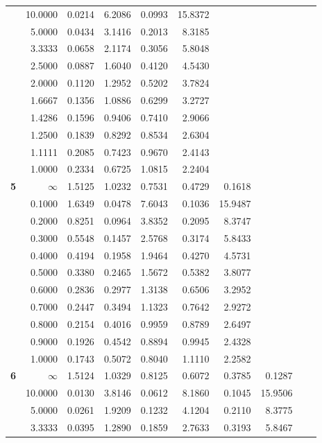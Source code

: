 \begin{table}[!htb]
\begin{center}
{\begin{tabular}{|c||r|r|r|r|r|r|r|r|r|}
&10.0000&0.0214&6.2086&0.0993&15.8372&     &     &     &     \\
&5.0000&0.0434&3.1416&0.2013&8.3185&     &     &     &     \\
&3.3333&0.0658&2.1174&0.3056&5.8048&     &     &     &     \\
&2.5000&0.0887&1.6040&0.4120&4.5430&     &     &     &     \\
&2.0000&0.1120&1.2952&0.5202&3.7824&     &     &     &     \\
&1.6667&0.1356&1.0886&0.6299&3.2727&     &     &     &     \\
&1.4286&0.1596&0.9406&0.7410&2.9066&     &     &     &     \\
&1.2500&0.1839&0.8292&0.8534&2.6304&     &     &     &     \\
&1.1111&0.2085&0.7423&0.9670&2.4143&     &     &     &     \\
&1.0000&0.2334&0.6725&1.0815&2.2404&     &     &     &     \\ \hline
\textbf{ 5}&$\infty$&1.5125&1.0232&0.7531&0.4729&0.1618&     &     &     \\
&0.1000&1.6349&0.0478&7.6043&0.1036&15.9487&     &     &     \\
&0.2000&0.8251&0.0964&3.8352&0.2095&8.3747&     &     &     \\
&0.3000&0.5548&0.1457&2.5768&0.3174&5.8433&     &     &     \\
&0.4000&0.4194&0.1958&1.9464&0.4270&4.5731&     &     &     \\
&0.5000&0.3380&0.2465&1.5672&0.5382&3.8077&     &     &     \\
&0.6000&0.2836&0.2977&1.3138&0.6506&3.2952&     &     &     \\
&0.7000&0.2447&0.3494&1.1323&0.7642&2.9272&     &     &     \\
&0.8000&0.2154&0.4016&0.9959&0.8789&2.6497&     &     &     \\
&0.9000&0.1926&0.4542&0.8894&0.9945&2.4328&     &     &     \\
&1.0000&0.1743&0.5072&0.8040&1.1110&2.2582&     &     &     \\ \hline
\textbf{ 6}&$\infty$&1.5124&1.0329&0.8125&0.6072&0.3785&0.1287&     &     \\
&10.0000&0.0130&3.8146&0.0612&8.1860&0.1045&15.9506&     &     \\
&5.0000&0.0261&1.9209&0.1232&4.1204&0.2110&8.3775&     &     \\
&3.3333&0.0395&1.2890&0.1859&2.7633&0.3193&5.8467&     &     \\

\end{tabular}}
\end{center}
\end{table}
